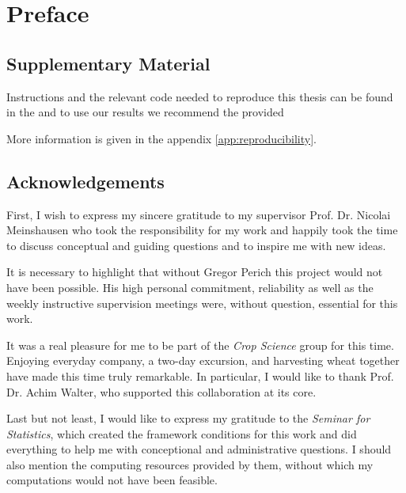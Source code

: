 \chapter*{Preface}

\section*{Supplementary Material}


Instructions and the relevant code needed to reproduce this thesis can be found in the \href{https://github.com/LGraz/MasterThesis-Code}{\color{blue}{GitHub repository}} and to use our results we recommend the provided \href{https://github.com/LGraz/CorrectTimeSeries }{\color{blue}{R-package}} 

More information is given in the appendix \ref{app:reproducibility}.  


\section*{Acknowledgements}
First, I wish to express my sincere gratitude to my supervisor Prof. Dr. Nicolai Meinshausen who took the responsibility for my work and happily took the time to discuss conceptual and guiding questions and to inspire me with new ideas. 

It is necessary to highlight that without Gregor Perich this project would not have been possible. His high personal commitment, reliability as well as the weekly instructive supervision meetings were, without question, essential for this work. 

It was a real pleasure for me to be part of the \textit{Crop Science} group for this time. Enjoying everyday company, a two-day excursion, and harvesting wheat together have made this time truly remarkable. In particular, I would like to thank Prof. Dr. Achim Walter, who supported this collaboration at its core.  

Last but not least, I would like to express my gratitude to the \textit{Seminar for Statistics}, which created the framework conditions for this work and did everything to help me with conceptional and administrative questions. I should also mention the computing resources provided by them, without which my computations would not have been feasible.


